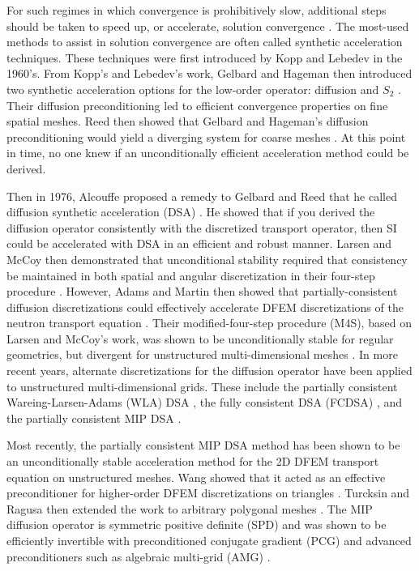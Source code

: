 For such regimes in which convergence is prohibitively slow, additional steps should be taken to speed up, or accelerate, solution convergence \cite{ref::adams_larsen_iter_methods}. The most-used methods to assist in solution convergence are often called synthetic acceleration techniques. These techniques were first introduced by Kopp \cite{kopp1963synthetic} and Lebedev \cite{lebedevI,lebedevII,lebedevIII,lebedevIV,lebedevV,lebedevVI,lebedevVII} in the 1960's. From Kopp's and Lebedev's work, Gelbard and Hageman then introduced two synthetic acceleration options for the low-order operator: diffusion and $S_2$ \cite{gelbard1969synthetic}. Their diffusion preconditioning led to efficient convergence properties on fine spatial meshes. Reed then showed that Gelbard and Hageman's diffusion preconditioning would yield a diverging system for coarse meshes \cite{reed1971effectiveness}. At this point in time, no one knew if an unconditionally efficient acceleration method could be derived.

Then in 1976, Alcouffe proposed a remedy to Gelbard and Reed that he called diffusion synthetic acceleration (DSA) \cite{alcouffe1976stable,alcouffe1977DSA,alcouffe1977diffusion}. He showed that if you derived the diffusion operator consistently with the discretized transport operator, then SI could be accelerated with DSA in an efficient and robust manner. Larsen and McCoy then demonstrated that unconditional stability required that consistency be maintained in both spatial and angular discretization in their four-step procedure \cite{larsen1982unconditionally_I,larsen1982unconditionally_II}. However, Adams and Martin then showed that partially-consistent diffusion discretizations could effectively accelerate DFEM discretizations of the neutron transport equation \cite{ref::dsa_DFEM_adams_martin}. Their modified-four-step procedure (M4S), based on Larsen and McCoy's work, was shown to be unconditionally stable for regular geometries, but divergent for unstructured multi-dimensional meshes \cite{warsa2002fully}. In more recent years, alternate discretizations for the diffusion operator have been applied to unstructured multi-dimensional grids. These include the partially consistent Wareing-Larsen-Adams (WLA) DSA \cite{ref::WLA_DSA}, the fully consistent DSA (FCDSA) \cite{warsa2002fully}, and the partially consistent MIP DSA \cite{ref::DSA_wang_ragusa,wang2009adaptive,turcksin2014discontinuous}.

Most recently, the partially consistent MIP DSA method has been shown to be an unconditionally stable acceleration method for the 2D DFEM transport equation on unstructured meshes. Wang showed that it acted as an effective preconditioner for higher-order DFEM discretizations on triangles \cite{ref::DSA_wang_ragusa,wang2009adaptive}. Turcksin and Ragusa then extended the work to arbitrary polygonal meshes \cite{turcksin2014discontinuous}. The MIP diffusion operator is symmetric positive definite (SPD) and was shown to be efficiently invertible with preconditioned conjugate gradient (PCG) and advanced preconditioners such as algebraic multi-grid (AMG) \cite{turcksin2014discontinuous}.

